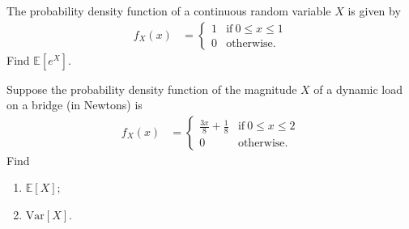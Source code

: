 \documentclass[10pt]{article}
\newenvironment{problem}[2][Problem]{\begin{trivlist}
\item[\hskip \labelsep {\bfseries #1}\hskip \labelsep {\bfseries #2.}]}{\end{trivlist}}
\begin{document}
\begin{problem}{5}
The probability density function of a continuous random variable $X$ is given by
\begin{align*}
    f_X(x) &= 
    \begin{cases}
      1 & \text{if}\ 0 \leq x \leq 1 \\
      0 & \text{otherwise.}
    \end{cases}
\end{align*}
Find $\mathbb{E}[e^X]$.
\end{problem}

\begin{problem}{6}
Suppose the probability density function of the magnitude $X$ of a dynamic load on a bridge (in Newtons) is
\begin{align*}
    f_X(x) &= 
    \begin{cases}
      \frac{3x}{8} + \frac{1}{8} & \text{if}\ 0 \leq x \leq 2 \\
      0 & \text{otherwise.}
    \end{cases}
\end{align*}
Find
\begin{enumerate}[label=(\alph*)]
\item $\mathbb{E}[X]$;
\item $\mathrm{Var}[X]$.
\end{enumerate}
\end{problem}

%
%

\end{document}
